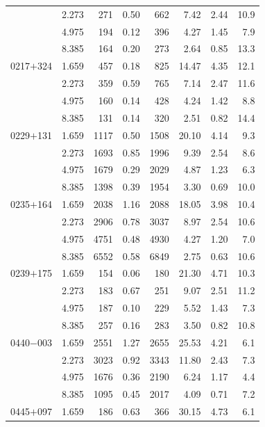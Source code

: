 \begin{longtable}{|c|c|r|c|r|r|r|r|}
           & 2.273 &   271 &  0.50 &   662 &  7.42 &  2.44 &  10.9 \\
           & 4.975 &   194 &  0.12 &   396 &  4.27 &  1.45 &   7.9 \\
           & 8.385 &   164 &  0.20 &   273 &  2.64 &  0.85 &  13.3 \\
0217$+$324 & 1.659 &   457 &  0.18 &   825 & 14.47 &  4.35 &  12.1 \\
           & 2.273 &   359 &  0.59 &   765 &  7.14 &  2.47 &  11.6 \\
           & 4.975 &   160 &  0.14 &   428 &  4.24 &  1.42 &   8.8 \\
           & 8.385 &   131 &  0.14 &   320 &  2.51 &  0.82 &  14.4 \\
0229$+$131 & 1.659 &  1117 &  0.50 &  1508 & 20.10 &  4.14 &   9.3 \\
           & 2.273 &  1693 &  0.85 &  1996 &  9.39 &  2.54 &   8.6 \\
           & 4.975 &  1679 &  0.29 &  2029 &  4.87 &  1.23 &   6.3 \\
           & 8.385 &  1398 &  0.39 &  1954 &  3.30 &  0.69 &  10.0 \\
0235$+$164 & 1.659 &  2038 &  1.16 &  2088 & 18.05 &  3.98 &  10.4 \\
           & 2.273 &  2906 &  0.78 &  3037 &  8.97 &  2.54 &  10.6 \\
           & 4.975 &  4751 &  0.48 &  4930 &  4.27 &  1.20 &   7.0 \\
           & 8.385 &  6552 &  0.58 &  6849 &  2.75 &  0.63 &  10.6 \\
0239$+$175 & 1.659 &   154 &  0.06 &   180 & 21.30 &  4.71 &  10.3 \\
           & 2.273 &   183 &  0.67 &   251 &  9.07 &  2.51 &  11.2 \\
           & 4.975 &   187 &  0.10 &   229 &  5.52 &  1.43 &   7.3 \\
           & 8.385 &   257 &  0.16 &   283 &  3.50 &  0.82 &  10.8 \\
0440$-$003 & 1.659 &  2551 &  1.27 &  2655 & 25.53 &  4.21 &   6.1 \\
           & 2.273 &  3023 &  0.92 &  3343 & 11.80 &  2.43 &   7.3 \\
           & 4.975 &  1676 &  0.36 &  2190 &  6.24 &  1.17 &   4.4 \\
           & 8.385 &  1095 &  0.45 &  2017 &  4.09 &  0.71 &   7.2 \\
0445$+$097 & 1.659 &   186 &  0.63 &   366 & 30.15 &  4.73 &   6.1 \\

\end{longtable}
